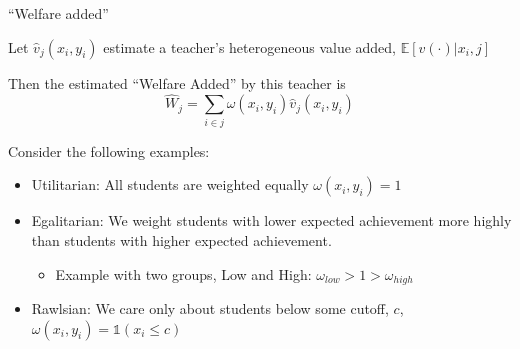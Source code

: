 \documentclass[t,aspectratio=169,11pt]{beamer}
\begin{document}
\begin{frame}{``Welfare added''}

\begin{wideitemize}

    \item Let $\hat{v}_j(x_i,y_i)$ estimate a teacher's heterogeneous value added, $\mathbb{E}[v(\cdot)|x_i,j]$
    
    \item Then the estimated ``Welfare Added'' by this teacher is  
    \[
    \hat{W}_j  = \sum_{i\in j} \omega(x_i,y_i) \hat{v}_j(x_i,y_i) 
    \] 
    
    \item Consider the following examples:
    \begin{itemize}
        \item Utilitarian: All students are weighted equally $\omega(x_i,y_i) = 1$
        
        \item Egalitarian: We weight students with lower expected achievement more highly than students with higher expected achievement.  
        \begin{itemize}
        \item Example with two groups, Low and High: $\omega_{low} > 1 > \omega_{high}$
        \end{itemize}
        \item Rawlsian: We care only about students below some cutoff, $c$, $\omega(x_i,y_i) = \mathds{1}(x_i\leq c)$
        
    \end{itemize}
    

\end{wideitemize}


\end{frame}



\end{document}
